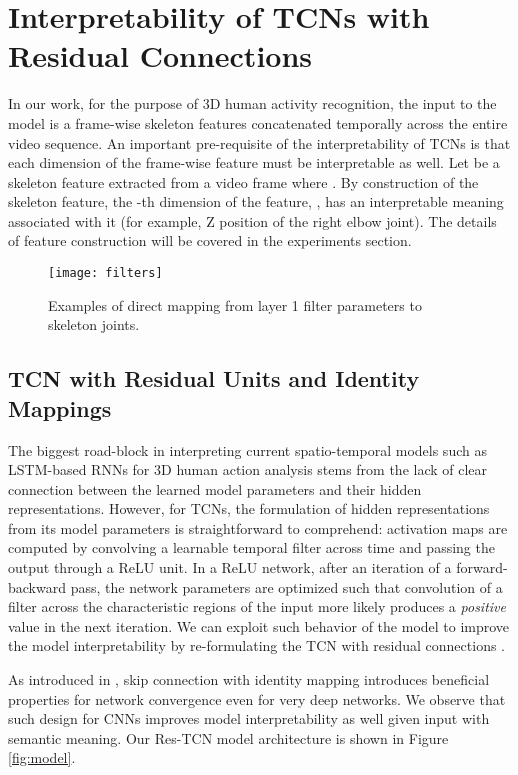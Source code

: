 \documentclass[10pt,twocolumn,letterpaper]{article}
\begin{document}
\section{Interpretability of TCNs with Residual Connections}

In our work, for the purpose of 3D human activity recognition, the input to the model  is a frame-wise skeleton features concatenated temporally across the entire video sequence. An important pre-requisite of the interpretability of TCNs is that each dimension of the frame-wise feature must be interpretable as well. Let  be a skeleton feature extracted from a video frame  where . By construction of the skeleton feature, the -th dimension of the feature, , has an interpretable meaning associated with it (for example, Z position of the right elbow joint). The details of feature construction will be covered in the experiments section. 


\begin{figure*}
\begin{center}
 \texttt{[image: filters]}
\end{center}
 \caption{Examples of direct mapping from layer 1 filter parameters to skeleton joints.}
\label{fig:filter}
\end{figure*}

\subsection{TCN with Residual Units and Identity Mappings}
The biggest road-block in interpreting current spatio-temporal models such as LSTM-based RNNs for 3D human action analysis stems from the lack of clear connection between the learned model parameters and their hidden representations. However, for TCNs, the formulation of hidden representations from its model parameters is straightforward to comprehend: activation maps are computed by convolving a learnable temporal filter across time and passing the output through a ReLU unit. In a ReLU network, after an iteration of a forward-backward pass, the network parameters are optimized such that convolution of a filter across the characteristic regions of the input more likely produces a \textit{positive} value in the next iteration. We can exploit such behavior of the model to improve the model interpretability by re-formulating the TCN with residual connections \cite{resnet}.

As introduced in \cite{resnet}, skip connection with identity mapping introduces beneficial properties for network convergence even for very deep networks. We observe that such design for CNNs improves model interpretability as well given input with semantic meaning. Our Res-TCN model architecture is shown in Figure \ref{fig:model}. 
\end{document}
